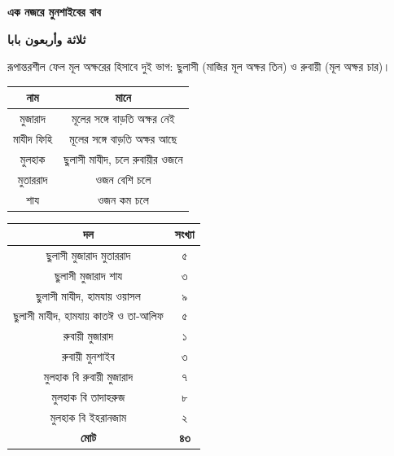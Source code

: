 \newpage

\begin{center}
  {\large\bfseries\color{titlegreen} এক নজরে মুনশাইবের বাব}

  \vspace{0.12cm}

  {\arabicfont\normalsize\bfseries\textarabic{ثلاثة وأربعون بابا}}
\end{center}

\vspace{0.15cm}

\noindent রূপান্তরশীল ফেল মূল অক্ষরের হিসাবে দুই ভাগ:
ছুলাসী (মাজির মূল অক্ষর তিন) ও রুবায়ী (মূল অক্ষর চার)।

\vspace{0.25cm}

\begingroup
\setlength{\arrayrulewidth}{0.5pt}
\setlength{\tabcolsep}{3pt}
\renewcommand{\arraystretch}{1.45}
\small

\noindent\begin{tabularx}{\textwidth}{|C|C|}
  \hline
  {\color{white}\textbf{নাম}} &
  {\color{white}\textbf{মানে}} \\
  \hline
  মুজারাদ & মূলের সঙ্গে বাড়তি অক্ষর নেই \\
  \hline
  মাযীদ ফিহি & মূলের সঙ্গে বাড়তি অক্ষর আছে \\
  \hline
  মুলহাক & ছুলাসী মাযীদ, চলে রুবায়ীর ওজনে \\
  \hline
  মুতাররাদ & ওজন বেশি চলে \\
  \hline
  শায & ওজন কম চলে \\
  \hline
\end{tabularx}

\vspace{0.35cm}

\noindent\begin{tabularx}{\textwidth}{|C|C|}
  \hline
  {\color{white}\textbf{দল}} &
  {\color{white}\textbf{সংখ্যা}} \\
  \hline
  ছুলাসী মুজারাদ মুতাররাদ & ৫ \\
  \hline
  ছুলাসী মুজারাদ শায & ৩ \\
  \hline
  ছুলাসী মাযীদ, হামযায় ওয়াসল & ৯ \\
  \hline
  ছুলাসী মাযীদ, হামযায় কাতঈ ও তা-আলিফ & ৫ \\
  \hline
  রুবায়ী মুজারাদ & ১ \\
  \hline
  রুবায়ী মুনশাইব & ৩ \\
  \hline
  মুলহাক বি রুবায়ী মুজারাদ & ৭ \\
  \hline
  মুলহাক বি তাদাহরুজ & ৮ \\
  \hline
  মুলহাক বি ইহরানজাম & ২ \\
  \hline
  {\color{white}\textbf{মোট}} &
  {\color{white}\textbf{৪৩}} \\
  \hline
\end{tabularx}
\endgroup

